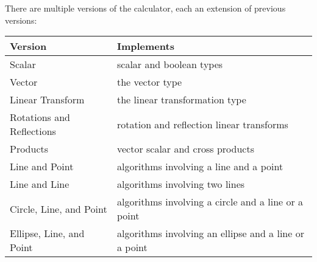 \documentclass[12pt]{article}
\begin{document}
\newpage

There are multiple versions of the calculator, each an extension
of previous versions:
\begin{center}
\small
\begin{tabular}{ll}
Version & Implements
\\\hline
Scalar	& scalar and boolean types \\
Vector  & the vector type \\
Linear Transform & the linear transformation type \\
Rotations and Reflections & rotation and reflection linear transforms \\
Products & vector scalar and cross products \\
Line and Point & algorithms involving a line and a point \\
Line and Line & algorithms involving two lines \\
Circle, Line, and Point & algorithms involving a circle and a line or a point \\
Ellipse, Line, and Point & algorithms involving an ellipse
                           and a line or a point \\

\end{tabular}
\end{center}
\end{document}

